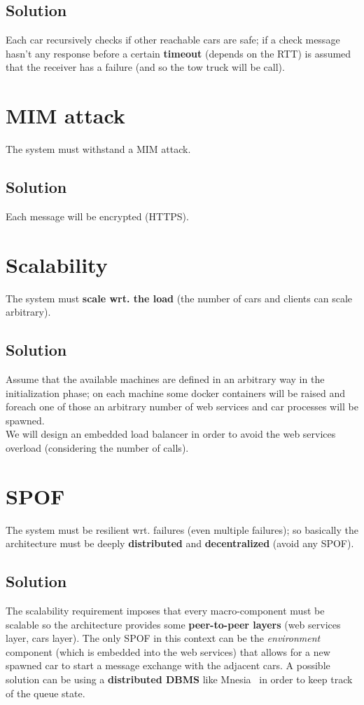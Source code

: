 \subsection{Solution}

Each car recursively checks if other reachable cars are safe; if a check message
hasn't any response before a certain \textbf{timeout} (depends on the RTT) is assumed 
that the receiver has a failure (and so the tow truck will be call).


\section{MIM attack}

The system must withstand a MIM attack.


\subsection{Solution}

Each message will be encrypted (HTTPS).


\section{Scalability}

The system must \textbf{scale wrt. the load} 
(the number of cars and clients can scale arbitrary).


\subsection{Solution}

Assume that the available machines are defined in an arbitrary 
way in the initialization phase; on each machine some docker containers 
will be raised and foreach one of those an arbitrary number of web services and 
car processes will be spawned.\\

We will design an embedded load balancer in order to avoid the web services overload 
(considering the number of calls).


\section{SPOF}

The system must be resilient wrt. failures (even multiple failures);
so basically the architecture must be deeply \textbf{distributed} 
and \textbf{decentralized} (avoid any SPOF). 


\subsection{Solution}

The scalability requirement imposes that every macro-component must be scalable 
so the architecture provides some \textbf{peer-to-peer layers} 
(web services layer, cars layer).
The only SPOF in this context can be the \textit{environment} component 
(which is embedded into the web services) that allows for a new spawned car to 
start a message exchange with the adjacent cars. 
A possible solution can be using a \textbf{distributed DBMS} like Mnesia~\cite{1} in order to keep 
track of the queue state.